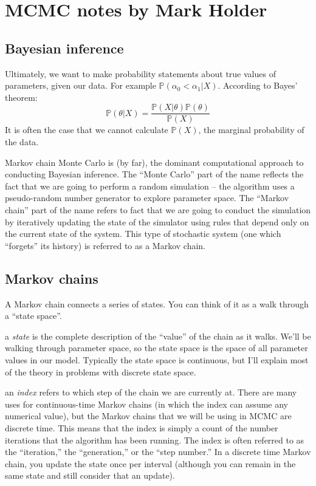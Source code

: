 \documentclass[11pt]{article}
\renewcommand{\Pr}{{\mathbb P}}
\begin{document}

\section*{MCMC notes by Mark Holder}
\subsection*{Bayesian inference}
Ultimately, we want to make probability statements about true values of parameters, given our data. For example $\Pr(\alpha_0 < \alpha_1|X)$.
According to Bayes' theorem:
	$$\Pr(\theta|X) = \frac{\Pr(X|\theta)\Pr(\theta)}{\Pr(X)}$$
It is often the case that we cannot calculate $\Pr(X)$, the marginal probability of the data.


Markov chain Monte Carlo is (by far), the dominant computational approach to conducting Bayesian inference.
The ``Monte Carlo'' part of the name reflects the fact that we are going to perform a random simulation -- the algorithm uses a pseudo-random number generator to explore parameter space.
The ``Markov chain'' part of the name refers to fact that we are going to conduct the simulation by iteratively updating the state of the simulator using rules that depend only on the current state of the system.
This type of stochastic system (one which ``forgets'' its history) is referred to as a Markov chain.

\subsection*{Markov chains}
A Markov chain connects a series of states.
You can think of it as a walk through a ``state space''.
\begin{compactitem}
	\item a {\em state} is the complete description of the ``value'' of the chain as it walks.  We'll be walking through parameter space, so the state space is the space of all parameter values in our model.
	Typically the state space is continuous, but I'll explain most of the theory in problems with discrete state space.
	\item an {\em index} refers to which step of the chain we are currently at. There are many uses for continuous-time Markov chains (in which the index can assume any numerical value), but the Markov chains that we will be using in MCMC are discrete time.  This means that the index is simply a count of the number iterations that the algorithm has been running.  The index is often referred to as the ``iteration,'' the ``generation,'' or the ``step number.''  In a discrete time Markov chain, you update the state once per interval (although you can remain in the same state and still consider that an update).
\end{compactitem}
\end{document}
